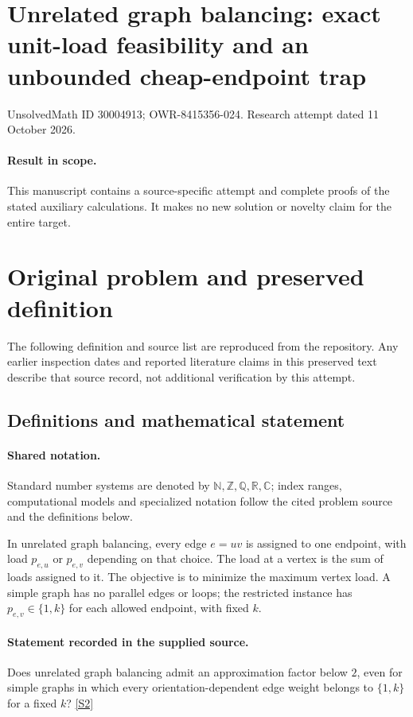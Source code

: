 \documentclass[11pt]{article}
\begin{document}
\section*{Unrelated graph balancing: exact unit-load feasibility and an unbounded cheap-endpoint trap}
\noindent UnsolvedMath ID 30004913; OWR-8415356-024. Research attempt dated 11 October 2026.
\paragraph{Result in scope.}This manuscript contains a source-specific attempt and complete proofs of the stated auxiliary calculations. It makes no new solution or novelty claim for the entire target.
\section{Original problem and preserved definition}
The following definition and source list are reproduced from the repository. Any earlier inspection dates and reported literature claims in this preserved text describe that source record, not additional verification by this attempt.
\subsection{Definitions and mathematical statement}

\paragraph{Shared notation.}Standard number systems are denoted by $\mathbb N,\mathbb Z,\mathbb Q,\mathbb R,\mathbb C$; index ranges, computational models and specialized notation follow the cited problem source and the definitions below.


In unrelated graph balancing, every edge $e=uv$ is assigned to one endpoint, with load $p_{e,u}$ or $p_{e,v}$ depending on that choice. The load at a vertex is the sum of loads assigned to it. The objective is to minimize the maximum vertex load. A simple graph has no parallel edges or loops; the restricted instance has $p_{e,v}\in\{1,k\}$ for each allowed endpoint, with fixed $k$.
\paragraph{Statement recorded in the supplied source.}
Does unrelated graph balancing admit an approximation factor below $2$, even for simple graphs in which every orientation-dependent edge weight belongs to $\{1,k\}$ for a fixed $k$? \href{https://doi.org/10.4171/owr/2021/53}{[S2]}
\end{document}
